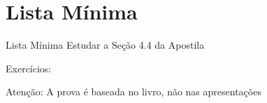 \documentclass[fleqn,utf8,aspectratio=169,12pt]{beamer}
\begin{document}
\section{Lista Mínima}

\begin{frame}{Lista Mínima}
  Estudar a Seção 4.4 da Apostila

  Exercícios:

  \vfill
  Atenção: A prova é baseada no livro, não nas apresentações
\end{frame}

\end{document}
